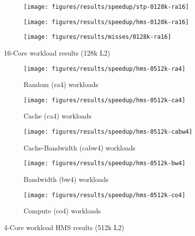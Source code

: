 \begin{figure}
    \centering
    \begin{subfigure}[b]{\textwidth}
            \texttt{[image: figures/results/speedup/stp-0128k-ra16]}
            \label{fig:results:4core:hms:random}
    \end{subfigure}

    \begin{subfigure}[b]{\textwidth}
            \texttt{[image: figures/results/speedup/hms-0128k-ra16]}
            \label{fig:results:4core:hms:cache}
    \end{subfigure}
    \begin{subfigure}[b]{\textwidth}
            \texttt{[image: figures/results/misses/0128k-ra16]}
            \label{fig:results:4core:hms:cache-bw}
    \end{subfigure}

    \caption{16-Core workload results (128k L2)}\label{fig:results:4core:hms}
\end{figure}


\begin{figure}
    \centering
    \begin{subfigure}[b]{\textwidth}
            \texttt{[image: figures/results/speedup/hms-0512k-ra4]}
            \caption{Random (ra4) workloads}
            \label{fig:results:4core:hms:random}
    \end{subfigure}

    \begin{subfigure}[b]{0.5\textwidth}
            \texttt{[image: figures/results/speedup/hms-0512k-ca4]}
            \caption{Cache (ca4) workloads}
            \label{fig:results:4core:hms:cache}
    \end{subfigure}%
    \begin{subfigure}[b]{0.5\textwidth}
            \texttt{[image: figures/results/speedup/hms-0512k-cabw4]}
            \caption{Cache-Bandwidth (cabw4) workloads}
            \label{fig:results:4core:hms:cache-bw}
    \end{subfigure}

    \begin{subfigure}[b]{0.5\textwidth}
            \texttt{[image: figures/results/speedup/hms-0512k-bw4]}
            \caption{Bandwidth (bw4) workloads}
            \label{fig:results:4core:hms:bw}
    \end{subfigure}%
    \begin{subfigure}[b]{0.5\textwidth}
            \texttt{[image: figures/results/speedup/hms-0512k-co4]}
            \caption{Compute (co4) workloads}
            \label{fig:results:4core:hms:co}
    \end{subfigure}%

    \caption{4-Core workload HMS results (512k L2)}\label{fig:results:4core:hms}
\end{figure}

